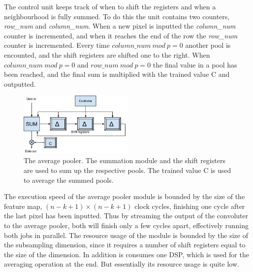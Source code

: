 The control unit keeps track of when to shift the registers and when a neighbourhood is fully summed. To do this the unit contains two counters, \textit{row\_num} and \textit{column\_num}. When a new pixel is inputted the \textit{column\_num} counter is incremented, and when it reaches the end of the row the \textit{row\_num} counter is incremented. Every time $ column\_num~mod~p = 0 $ another pool is encounted, and the shift registers are shifted one to the right. When $ column\_num~mod~p = 0 $ and $ row\_num~mod~p = 0 $ the final value in a pool has been reached, and the final sum is multiplied with the trained value C and outputted. 

\begin{figure}[h!]
  \centering
      \includegraphics[width=0.5\textwidth]{Figures/Method/submax}
  \caption{The average pooler. The summation module and the shift registers are used to sum up the respective pools. The trained value C is used to average the summed pools.}
  \label{fig_average_pooler}
\end{figure}

The execution speed of the average pooler module is bounded by the size of the feature map, $ (n-k+1) \times (n-k+1) $ clock cycles, finishing one cycle after the last pixel has been inputted. Thus by streaming the output of the convoluter to the average pooler, both will finish only a few cycles apart, effectively running both jobs in parallel. The resource usage of the module is bounded by the size of the subsampling dimension, since it requires a number of shift registers equal to the size of the dimension. In addition is consumes one DSP, which is used for the averaging operation at the end. But essentially its resource usage is quite low.  

